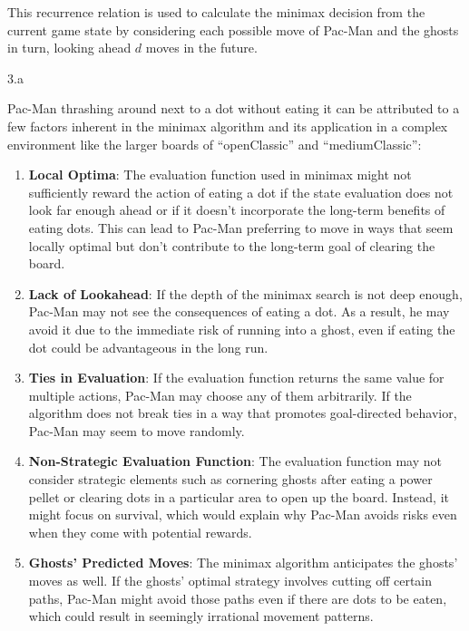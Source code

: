 \begin{answer}
This recurrence relation is used to calculate the minimax decision from the current game state by considering each possible move of Pac-Man and the ghosts in turn, looking ahead \( d \) moves in the future.

\end{answer}
\clearpage

\LARGE
3.a
\normalsize

\begin{answer}
Pac-Man thrashing around next to a dot without eating it can be attributed to a few factors inherent in the minimax algorithm and its application in a complex environment like the larger boards of ``openClassic'' and ``mediumClassic'':

\begin{enumerate}[label=\textbf{\arabic*.}]
\item \textbf{Local Optima}: The evaluation function used in minimax might not sufficiently reward the action of eating a dot if the state evaluation does not look far enough ahead or if it doesn't incorporate the long-term benefits of eating dots. This can lead to Pac-Man preferring to move in ways that seem locally optimal but don't contribute to the long-term goal of clearing the board.

\item \textbf{Lack of Lookahead}: If the depth of the minimax search is not deep enough, Pac-Man may not see the consequences of eating a dot. As a result, he may avoid it due to the immediate risk of running into a ghost, even if eating the dot could be advantageous in the long run.

\item \textbf{Ties in Evaluation}: If the evaluation function returns the same value for multiple actions, Pac-Man may choose any of them arbitrarily. If the algorithm does not break ties in a way that promotes goal-directed behavior, Pac-Man may seem to move randomly.

\item \textbf{Non-Strategic Evaluation Function}: The evaluation function may not consider strategic elements such as cornering ghosts after eating a power pellet or clearing dots in a particular area to open up the board. Instead, it might focus on survival, which would explain why Pac-Man avoids risks even when they come with potential rewards.

\item \textbf{Ghosts' Predicted Moves}: The minimax algorithm anticipates the ghosts' moves as well. If the ghosts' optimal strategy involves cutting off certain paths, Pac-Man might avoid those paths even if there are dots to be eaten, which could result in seemingly irrational movement patterns.


\end{enumerate}
\end{answer}
